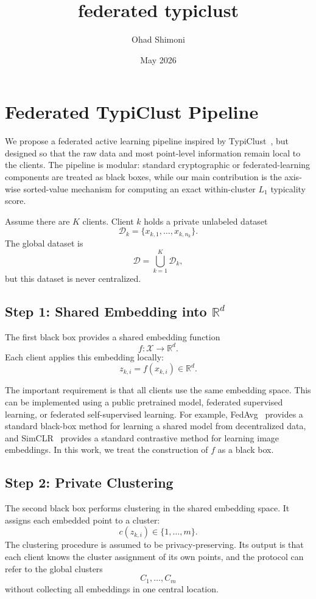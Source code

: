 \documentclass{article}
\title{federated typiclust}
\author{Ohad Shimoni}
\date{May 2026}
\begin{document}
\maketitle


\section{Federated TypiClust Pipeline}

We propose a federated active learning pipeline inspired by TypiClust~\cite{hacohen2022active}, but designed so that the raw data and most point-level information remain local to the clients. The pipeline is modular: standard cryptographic or federated-learning components are treated as black boxes, while our main contribution is the axis-wise sorted-value mechanism for computing an exact within-cluster $L_1$ typicality score.

Assume there are $K$ clients. Client $k$ holds a private unlabeled dataset
\[
    \mathcal{D}_k = \{x_{k,1},\dots,x_{k,n_k}\}.
\]
The global dataset is
\[
    \mathcal{D} = \bigcup_{k=1}^K \mathcal{D}_k,
\]
but this dataset is never centralized.

\subsection{Step 1: Shared Embedding into $\mathbb{R}^d$}

The first black box provides a shared embedding function
\[
    f : \mathcal{X} \rightarrow \mathbb{R}^d.
\]
Each client applies this embedding locally:
\[
    z_{k,i} = f(x_{k,i}) \in \mathbb{R}^d.
\]

The important requirement is that all clients use the same embedding space. This can be implemented using a public pretrained model, federated supervised learning, or federated self-supervised learning. For example, FedAvg~\cite{mcmahan2017communication} provides a standard black-box method for learning a shared model from decentralized data, and SimCLR~\cite{chen2020simple} provides a standard contrastive method for learning image embeddings. In this work, we treat the construction of $f$ as a black box.

\subsection{Step 2: Private Clustering}

The second black box performs clustering in the shared embedding space. It assigns each embedded point to a cluster:
\[
    c(z_{k,i}) \in \{1,\dots,m\}.
\]
The clustering procedure is assumed to be privacy-preserving. Its output is that each client knows the cluster assignment of its own points, and the protocol can refer to the global clusters
\[
    C_1,\dots,C_m
\]
without collecting all embeddings in one central location.
\end{document}
